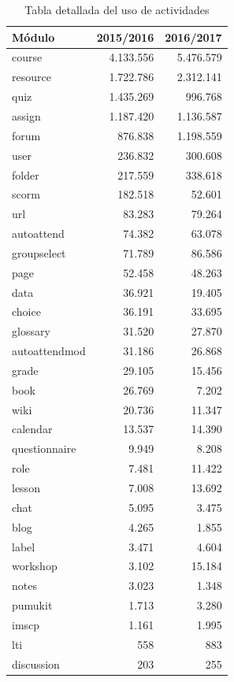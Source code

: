 \begin{table}[H]
\centering
\begin{tabular}{|l|r|r|}
\hline
\textbf{Módulo} & \textbf{2015/2016} & \textbf{2016/2017} \\ \hline
course        & 4.133.556 & 5.476.579 \\
resource      & 1.722.786 & 2.312.141 \\
quiz          & 1.435.269 & 996.768   \\
assign        & 1.187.420 & 1.136.587 \\
forum         & 876.838   & 1.198.559 \\
user          & 236.832   & 300.608   \\
folder        & 217.559   & 338.618   \\
scorm         & 182.518   & 52.601    \\
url           & 83.283    & 79.264    \\
autoattend    & 74.382    & 63.078    \\
groupselect   & 71.789    & 86.586    \\
page          & 52.458    & 48.263    \\
data          & 36.921    & 19.405    \\
choice        & 36.191    & 33.695    \\
glossary      & 31.520    & 27.870    \\
autoattendmod & 31.186    & 26.868    \\
grade         & 29.105    & 15.456    \\
book          & 26.769    & 7.202     \\
wiki          & 20.736    & 11.347    \\
calendar      & 13.537    & 14.390    \\
questionnaire & 9.949     & 8.208     \\
role          & 7.481     & 11.422    \\
lesson        & 7.008     & 13.692    \\
chat          & 5.095     & 3.475     \\
blog          & 4.265     & 1.855     \\
label         & 3.471     & 4.604     \\
workshop      & 3.102     & 15.184    \\
notes         & 3.023     & 1.348     \\
pumukit       & 1.713     & 3.280     \\
imscp         & 1.161     & 1.995     \\
lti           & 558       & 883       \\
discussion    & 203       & 255
\end{tabular}
\caption{Tabla detallada del uso de actividades}
\label{table:usoactividades_2015}
\end{table}


